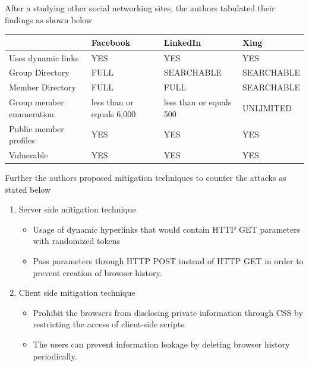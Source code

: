 \documentclass{article}
\begin{document}
\begin {flushleft}
\begin{enumerate}
After a studying other social networking sites, the authors tabulated their findings as shown below


\begin{center}
\begin{tabular}{ |p{3cm}||p{3cm}||p{3cm}||p{3cm}| }
\hline
     &  Facebook& LinkedIn & Xing  \\ 
\hline
Uses dynamic links &  YES & YES & YES  \\ 
\hline
Group Directory &  FULL & SEARCHABLE & SEARCHABLE  \\ 
\hline
Member Directory &  FULL & FULL & SEARCHABLE  \\ 
\hline
Group member enumeration &  less than or equals 6,000 & less than or equals 500 & UNLIMITED  \\ 
\hline
Public member profiles &  YES & YES & YES  \\ 
\hline
Vulnerable &  YES & YES & YES  \\ 
\hline

\end{tabular}
\end{center}

\end{enumerate}

Further the authors proposed mitigation techniques to counter the attacks as stated below
\begin{enumerate}
\item  Server­ side mitigation technique
\begin{itemize}
\item Usage of dynamic hyperlinks that would contain HTTP GET parameters with randomized tokens
\item Pass parameters through HTTP POST instead of HTTP GET in order to prevent creation of browser history.
\end{itemize}
   
\item  Client ­side mitigation technique 
\begin{itemize}
\item	Prohibit the browsers from disclosing private information through CSS by restricting the access of client-side scripts. 
\item	The users can prevent information leakage by deleting browser history periodically. 
\end{itemize}
\end{enumerate}
\end {flushleft}
\end{document}

